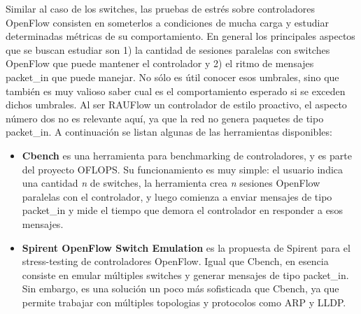 Similar al caso de los switches, las pruebas de estrés sobre controladores OpenFlow consisten en someterlos a condiciones de mucha carga y estudiar determinadas métricas de su comportamiento. En general los principales aspectos que se buscan estudiar son 1) la cantidad de sesiones paralelas con switches OpenFlow que puede mantener el controlador y 2) el ritmo de mensajes packet\_in que puede manejar. No sólo es útil conocer esos umbrales, sino que también es muy valioso saber cual es el comportamiento esperado si se exceden dichos umbrales. Al ser RAUFlow un controlador de estilo proactivo, el aspecto número dos no es relevante aquí, ya que la red no genera paquetes de tipo packet\_in. A continuación se listan algunas de las herramientas disponibles:
\begin{itemize}
	\item \textbf{Cbench} \cite{cbench} es una herramienta para benchmarking de controladores, y es parte del proyecto OFLOPS. Su funcionamiento es muy simple: el usuario indica una cantidad \textit{n} de switches, la herramienta crea \textit{n} sesiones OpenFlow paralelas con el controlador, y luego comienza a enviar mensajes de tipo packet\_in y mide el tiempo que demora el controlador en responder a esos mensajes.
	\item \textbf{Spirent OpenFlow Switch Emulation} \cite{spirent-switch-emulation} es la propuesta de Spirent para el stress-testing de controladores OpenFlow. Igual que Cbench, en esencia consiste en emular múltiples switches y generar mensajes de tipo packet\_in. Sin embargo, es una solución un poco más sofisticada que Cbench, ya que permite trabajar con múltiples topologias y protocolos como ARP y LLDP.
\end{itemize}


